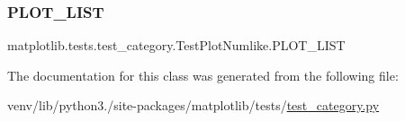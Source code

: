 \subsubsection{\texorpdfstring{P\+L\+O\+T\+\_\+\+L\+I\+ST}{PLOT\_LIST}}
{\footnotesize\ttfamily matplotlib.\+tests.\+test\+\_\+category.\+Test\+Plot\+Numlike.\+P\+L\+O\+T\+\_\+\+L\+I\+ST\hspace{0.3cm}{\ttfamily [static]}}



The documentation for this class was generated from the following file\+:\begin{DoxyCompactItemize}
\item 
venv/lib/python3./site-\/packages/matplotlib/tests/\hyperlink{test__category_8py}{test\+\_\+category.\+py}\end{DoxyCompactItemize}

